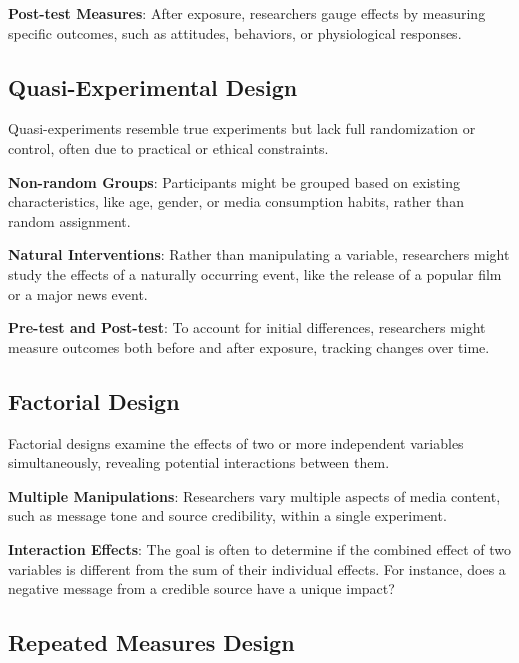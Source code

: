 \documentclass[
  b5paper]{book}
\begin{document}
\textbf{Post-test Measures}: After exposure, researchers gauge effects by measuring specific outcomes, such as attitudes, behaviors, or physiological responses.

\hypertarget{quasi-experimental-design}{%
\subsection*{Quasi-Experimental Design}\label{quasi-experimental-design}}

Quasi-experiments resemble true experiments but lack full randomization or control, often due to practical or ethical constraints.

\textbf{Non-random Groups}: Participants might be grouped based on existing characteristics, like age, gender, or media consumption habits, rather than random assignment.

\textbf{Natural Interventions}: Rather than manipulating a variable, researchers might study the effects of a naturally occurring event, like the release of a popular film or a major news event.

\textbf{Pre-test and Post-test}: To account for initial differences, researchers might measure outcomes both before and after exposure, tracking changes over time.

\hypertarget{factorial-design}{%
\subsection*{Factorial Design}\label{factorial-design}}

Factorial designs examine the effects of two or more independent variables simultaneously, revealing potential interactions between them.

\textbf{Multiple Manipulations}: Researchers vary multiple aspects of media content, such as message tone and source credibility, within a single experiment.

\textbf{Interaction Effects}: The goal is often to determine if the combined effect of two variables is different from the sum of their individual effects. For instance, does a negative message from a credible source have a unique impact?

\hypertarget{repeated-measures-design}{%
\subsection*{Repeated Measures Design}\label{repeated-measures-design}}
\end{document}

